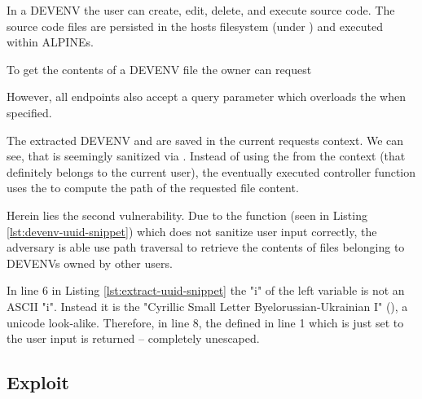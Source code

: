 \documentclass[10pt]{article}
\begin{document}
In a DEVENV the user can create, edit, delete, and execute source code. The source code files are persisted in the hosts filesystem (under ) and executed within ALPINEs.

To get the contents of a DEVENV file the owner can request
\begin{center}
\end{center}
However, all  endpoints also accept a query parameter  which overloads the  when specified.



The extracted DEVENV and  are saved in the current requests context. We can see, that  is seemingly sanitized via . Instead of using the  from the context (that definitely belongs to the current user), the eventually executed controller function  uses the  to compute the path of the requested file content.



Herein lies the second vulnerability. Due to the  function (seen in Listing \ref{lst:devenv-uuid-snippet}) which does not sanitize user input correctly, the adversary is able use path traversal to retrieve the contents of files belonging to DEVENVs owned by other users.



In line 6 in Listing \ref{lst:extract-uuid-snippet} the "i" of the left  variable is not an ASCII "i". Instead it is the "Cyrillic Small Letter Byelorussian-Ukrainian I" (), a unicode look-alike. Therefore, in line 8, the  defined in line 1 which is just set to the user input is returned -- completely unescaped.

\subsection{Exploit}
\end{document}
